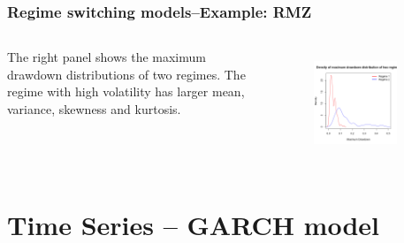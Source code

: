 \documentclass{beamer}
\newcommand\Fontviii{\fontsize{8}{9.2}\selectfont}
\begin{document}
\begin{frame}
\frametitle{Regime switching models--Example: RMZ}
\Fontviii

\begin{columns}[c] %

The right panel shows the maximum drawdown distributions of two regimes. The regime with high volatility has larger mean, variance, skewness and kurtosis.

\begin{figure}[h]
\centering 
\includegraphics[width=0.8\textwidth]{../results/regime/RMZ_mon1_mdd}
\label{fig: RMZregime_mdd}
\end{figure}
\end{columns}

\end{frame}



\section{Time Series – GARCH model}
\end{document}
